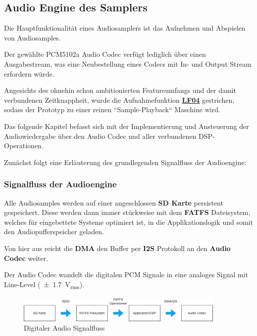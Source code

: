 \subsection{Audio Engine des Samplers}\label{sec:audio-engine}

Die Hauptfunktionalität eines Audiosamplers ist das Aufnehmen und Abspielen von Audiosamples. 

Der gewählte PCM5102a Audio Codec verfügt lediglich über einen Ausgabestream, was eine Neubestellung eines Codecs mit In- und Output Stream erfordern würde.

Angesichts des ohnehin schon ambitionierten Featureumfangs und der damit verbundenen Zeitknappheit, wurde die Aufnahmefunktion \textbf{\hyperlink{lf-audiorecord}{LF04}} gestrichen, sodass der Prototyp zu einer reinen ``Sample-Playback`` Maschine wird. 

Das folgende Kapitel befasst sich mit der Implementierung und Ansteuerung der Audiowiedergabe über den Audio Codec und aller verbundenen DSP-Operationen.

Zunächst folgt eine Erläuterung des grundlegenden Signalfluss der Audioengine:

\subsubsection{Signalfluss der Audioengine}

Alle Audiosamples werden auf einer angeschlossen \textbf{SD Karte} persistent gespeichert. Diese werden dann immer stückweise mit dem \textbf{FATFS} Dateisystem, welches für eingebettete Systeme optimiert ist, in die Applikationslogik und somit den Audiopufferspeicher geladen. 

Von hier aus reicht die \textbf{DMA} den Buffer per \textbf{I2S} Protokoll an den \textbf{Audio Codec} weiter. 

Der Audio Codec wandelt die digitalen PCM Signale in eine analoges Signal mit Line-Level (\SI{\pm 1.7}{\volt_{rms}}).

\begin{figure}[h!]
	\centering
	\includegraphics[width=0.9\textwidth]{images/08_durchfuehrung/audio/audio_signalflow.drawio.png}
	\caption{Digitaler Audio Signalfluss}
	\label{fig:audio_signalflow}
\end{figure}


